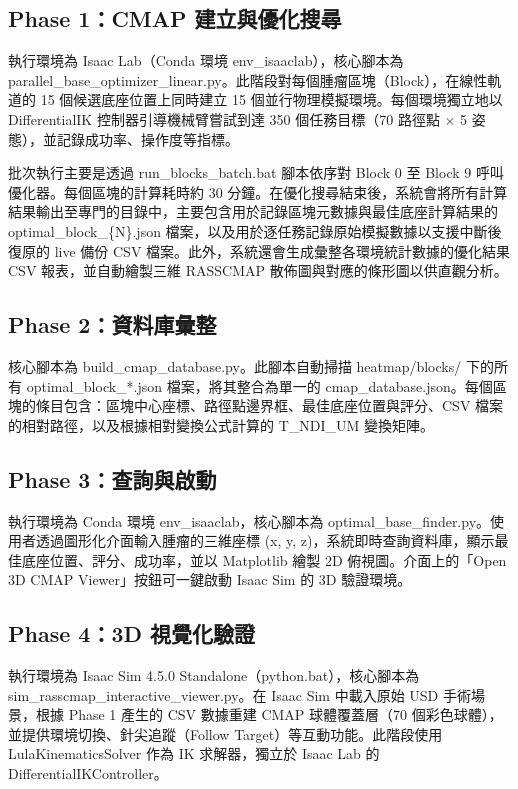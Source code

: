 \documentclass[a4paper, 12pt]{article}
\begin{document}
\subsection{Phase 1：CMAP 建立與優化搜尋}
\label{subsec:phase1}

執行環境為 Isaac Lab（Conda 環境 env\_isaaclab），核心腳本為 parallel\_base\_optimizer\_linear.py。此階段對每個腫瘤區塊（Block），在線性軌道的 15 個候選底座位置上同時建立 15 個並行物理模擬環境。每個環境獨立地以 DifferentialIK 控制器引導機械臂嘗試到達 350 個任務目標（70 路徑點 × 5 姿態），並記錄成功率、操作度等指標。

批次執行主要是透過 run\_blocks\_batch.bat 腳本依序對 Block 0 至 Block 9 呼叫優化器。每個區塊的計算耗時約 30 分鐘。在優化搜尋結束後，系統會將所有計算結果輸出至專門的目錄中，主要包含用於記錄區塊元數據與最佳底座計算結果的 optimal\_block\_\{N\}.json 檔案，以及用於逐任務記錄原始模擬數據以支援中斷後復原的 live 備份 CSV 檔案。此外，系統還會生成彙整各環境統計數據的優化結果 CSV 報表，並自動繪製三維 RASSCMAP 散佈圖與對應的條形圖以供直觀分析。

\subsection{Phase 2：資料庫彙整}
\label{subsec:phase2}

核心腳本為 build\_cmap\_database.py。此腳本自動掃描 heatmap/blocks/ 下的所有 optimal\_block\_*.json 檔案，將其整合為單一的 cmap\_database.json。每個區塊的條目包含：區塊中心座標、路徑點邊界框、最佳底座位置與評分、CSV 檔案的相對路徑，以及根據相對變換公式計算的 T\_NDI\_UM 變換矩陣。

\subsection{Phase 3：查詢與啟動}
\label{subsec:phase3}

執行環境為 Conda 環境 env\_isaaclab，核心腳本為 optimal\_base\_finder.py。使用者透過圖形化介面輸入腫瘤的三維座標 (x, y, z)，系統即時查詢資料庫，顯示最佳底座位置、評分、成功率，並以 Matplotlib 繪製 2D 俯視圖。介面上的「Open 3D CMAP Viewer」按鈕可一鍵啟動 Isaac Sim 的 3D 驗證環境。

\subsection{Phase 4：3D 視覺化驗證}
\label{subsec:phase4}

執行環境為 Isaac Sim 4.5.0 Standalone（python.bat），核心腳本為 sim\_rasscmap\_interactive\_viewer.py。在 Isaac Sim 中載入原始 USD 手術場景，根據 Phase 1 產生的 CSV 數據重建 CMAP 球體覆蓋層（70 個彩色球體），並提供環境切換、針尖追蹤（Follow Target）等互動功能。此階段使用 LulaKinematicsSolver 作為 IK 求解器，獨立於 Isaac Lab 的 DifferentialIKController。
\end{document}
